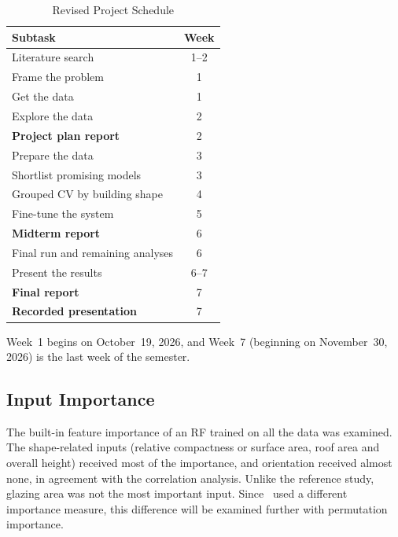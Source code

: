 \documentclass[journal]{IEEEtran}
\begin{document}
\begin{table}[!t]
\caption{Revised Project Schedule}
\label{tab:schedule}
\centering
\begin{tabularx}{\columnwidth}{@{}Xc@{}}
\toprule
Subtask & Week \\
\midrule
Literature search               & 1--2 \\
Frame the problem               & 1    \\
Get the data                    & 1    \\
Explore the data                & 2    \\
\textbf{Project plan report}    & 2    \\
Prepare the data                & 3    \\
Shortlist promising models      & 3    \\
Grouped CV by building shape    & 4    \\
Fine-tune the system            & 5    \\
\textbf{Midterm report}         & 6    \\
Final run and remaining analyses & 6   \\
Present the results             & 6--7 \\
\textbf{Final report}           & 7    \\
\textbf{Recorded presentation}  & 7    \\
\bottomrule
\end{tabularx}

\vspace{2pt}
\footnotesize Week~1 begins on October~19, 2026, and Week~7 (beginning on November~30, 2026)
is the last week of the semester.
\end{table}

\subsection{Input Importance}
The built-in feature importance of an RF trained on all the data was examined. The shape-related inputs
(relative compactness or surface area, roof area and overall height) received most of the importance,
and orientation received almost none, in agreement with the correlation analysis. Unlike the reference
study, glazing area was not the most important input. Since~\cite{tsanas2012} used a different importance
measure, this difference will be examined further with permutation importance.

\end{document}
